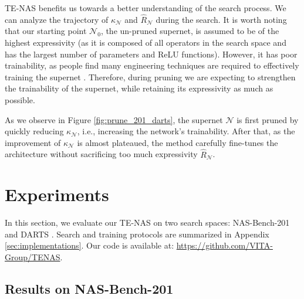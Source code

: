 \documentclass{article} \usepackage{iclr2021_conference,times}
\begin{document}
TE-NAS benefits us towards a better understanding of the search process. We can analyze the trajectory of $\kappa_\mathcal{N}$ and $\hat{R}_\mathcal{N}$ during the search. It is worth noting that our starting point $\mathcal{N}_0$, the un-pruned supernet, is assumed to be of the highest expressivity (as it is composed of all operators in the search space and has the largest number of parameters and ReLU functions). However, it has poor trainability, as people find many engineering techniques are required to effectively training the supernet \citep{yu2020bignas,yu2020train}. Therefore, during pruning we are expecting to strengthen the trainability of the supernet, while retaining its expressivity as much as possible.

As we observe in Figure \ref{fig:prune_201_darts}, the supernet $\mathcal{N}$ is first pruned by quickly reducing $\kappa_\mathcal{N}$, i.e., increasing the network's trainability. After that, as the improvement of $\kappa_\mathcal{N}$ is almost plateaued, the method carefully fine-tunes the architecture without sacrificing too much expressivity $\hat{R}_\mathcal{N}$.



\section{Experiments}

In this section, we evaluate our TE-NAS on two search spaces: NAS-Bench-201 \citep{dong2020bench} and DARTS \citep{liu2018darts}. Search and training protocols are summarized in Appendix \ref{sec:implementations}.
Our code is available at: \url{https://github.com/VITA-Group/TENAS}.

\vspace{-0.5em}
\subsection{Results on NAS-Bench-201}\label{sec:201}
\end{document}
